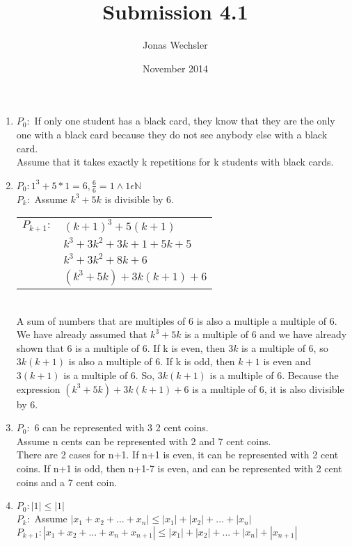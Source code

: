 \documentclass{article}
\title{Submission 4.1}
\author{Jonas Wechsler}
\date{November 2014}
\begin{document}
	\maketitle
	\begin{enumerate}
		\item
			$P_0:$ If only one student has a black card, they know that they are the only one with a black card because they do not see anybody else with a black card.\\
			Assume that it takes exactly k repetitions for k students with black cards.\\

		\item
			$P_0: 1^3 + 5*1 = 6, \frac{6}{6} = 1 \land 1 \epsilon \mathbb{N}$\\
			$P_k:$ Assume $k^3 + 5k$ is divisible by 6.\\
			\begin{tabular}{l l}
				$P_{k+1}:$ & $ (k+1)^3 + 5(k+1)$\\
				& $ k^3 + 3k^2 + 3k + 1 + 5k + 5$\\
				& $ k^3 + 3k^2 + 8k + 6$\\
				& $ (k^3 + 5k) + 3k(k + 1) + 6$\\
			\end{tabular}\\
			A sum of numbers that are multiples of 6 is also a multiple a multiple of 6. We have already assumed that $k^3 + 5k$ is a multiple of 6 and we have already shown that 6 is a multiple of 6. If k is even, then $3k$ is a multiple of 6, so $3k(k + 1)$ is also a multiple of 6. If k is odd, then $k+1$ is even and $3(k+1)$ is a multiple of 6. So, $3k(k+1)$ is a multiple of 6. Because the expression $(k^3 + 5k) + 3k(k+1) + 6$ is a multiple of 6, it is also divisible by 6.
		\item
			$P_0:$ 6 can be represented with 3 2 cent coins.\\
			Assume n cents can be represented with 2 and 7 cent coins.\\
			There are 2 cases for n+1. If n+1 is even, it can be represented with 2 cent coins. If n+1 is odd, then n+1-7 is even, and can be represented with 2 cent coins and a 7 cent coin.\\
		\item
			$P_0: |1| \leq |1|$\\
			$P_k:$ Assume $|x_1 + x_2 + ... + x_n| \leq |x_1| + |x_2| + ... + |x_n|$\\
			$P_{k+1}: |x_1 + x_2 + ... + x_n + x_{n+1}| \leq |x_1| + |x_2| + ... + |x_n| + |x_{n+1}|$\\

\end{enumerate}
\end{document}
